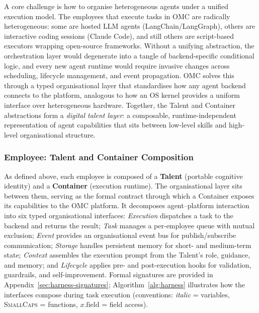 \documentclass[11pt,a4paper]{article}
\begin{document}
A core challenge is how to organise heterogeneous agents under a unified execution model.  The employees that execute tasks in OMC are radically heterogeneous: some are hosted LLM agents (LangChain/LangGraph), others are interactive coding sessions (Claude Code), and still others are script-based executors wrapping open-source frameworks.  Without a unifying abstraction, the orchestration layer would degenerate into a tangle of backend-specific conditional logic, and every new agent runtime would require invasive changes across scheduling, lifecycle management, and event propagation.  OMC solves this through a typed organisational layer that standardises how any agent backend connects to the platform, analogous to how an OS kernel provides a uniform interface over heterogeneous hardware.  Together, the Talent and Container abstractions form a \emph{digital talent layer}: a composable, runtime-independent representation of agent capabilities that sits between low-level skills and high-level organisational structure.

\subsubsection{Employee: Talent and Container Composition}

As defined above, each employee is composed of a \textbf{Talent} (portable cognitive identity) and a \textbf{Container} (execution runtime).  The organisational layer sits between them, serving as the formal contract through which a Container exposes its capabilities to the OMC platform.  It decomposes agent--platform interaction into six typed organisational interfaces: \emph{Execution} dispatches a task to the backend and returns the result; \emph{Task} manages a per-employee queue with mutual exclusion; \emph{Event} provides an organisational event bus for publish/subscribe communication; \emph{Storage} handles persistent memory for short- and medium-term state; \emph{Context} assembles the execution prompt from the Talent's role, guidance, and memory; and \emph{Lifecycle} applies pre- and post-execution hooks for validation, guardrails, and self-improvement.  Formal signatures are provided in Appendix~\ref{sec:harness-signatures}; Algorithm~\ref{alg:harness} illustrates how the interfaces compose during task execution (conventions: \textit{italic} = variables, \textsc{SmallCaps} = functions, $x.\mathrm{field}$ = field access).
\end{document}
